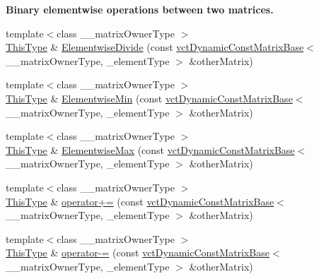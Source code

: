 \begin{Indent}{\bf Binary elementwise operations between two matrices.}
\begin{DoxyCompactItemize}
\item 
{\footnotesize template$<$class \-\_\-\-\_\-matrix\-Owner\-Type $>$ }\\\hyperlink{classvct_dynamic_const_matrix_base_ac4ff48cbe4d9de3fdef5a02447ffb9db}{This\-Type} \& \hyperlink{classvct_dynamic_matrix_base_a7be0d639e30525bfd8c4abfc39023b13}{Elementwise\-Divide} (const \hyperlink{classvct_dynamic_const_matrix_base}{vct\-Dynamic\-Const\-Matrix\-Base}$<$ \-\_\-\-\_\-matrix\-Owner\-Type, \-\_\-element\-Type $>$ \&other\-Matrix)
\item 
{\footnotesize template$<$class \-\_\-\-\_\-matrix\-Owner\-Type $>$ }\\\hyperlink{classvct_dynamic_const_matrix_base_ac4ff48cbe4d9de3fdef5a02447ffb9db}{This\-Type} \& \hyperlink{classvct_dynamic_matrix_base_aef9364af58997f201a1a3d56011e411c}{Elementwise\-Min} (const \hyperlink{classvct_dynamic_const_matrix_base}{vct\-Dynamic\-Const\-Matrix\-Base}$<$ \-\_\-\-\_\-matrix\-Owner\-Type, \-\_\-element\-Type $>$ \&other\-Matrix)
\item 
{\footnotesize template$<$class \-\_\-\-\_\-matrix\-Owner\-Type $>$ }\\\hyperlink{classvct_dynamic_const_matrix_base_ac4ff48cbe4d9de3fdef5a02447ffb9db}{This\-Type} \& \hyperlink{classvct_dynamic_matrix_base_a2c6d415e1bb9c356b9a843892b62b5c4}{Elementwise\-Max} (const \hyperlink{classvct_dynamic_const_matrix_base}{vct\-Dynamic\-Const\-Matrix\-Base}$<$ \-\_\-\-\_\-matrix\-Owner\-Type, \-\_\-element\-Type $>$ \&other\-Matrix)
\item 
{\footnotesize template$<$class \-\_\-\-\_\-matrix\-Owner\-Type $>$ }\\\hyperlink{classvct_dynamic_const_matrix_base_ac4ff48cbe4d9de3fdef5a02447ffb9db}{This\-Type} \& \hyperlink{classvct_dynamic_matrix_base_a733dcadf3529b4115cda4608cc2b9384}{operator+=} (const \hyperlink{classvct_dynamic_const_matrix_base}{vct\-Dynamic\-Const\-Matrix\-Base}$<$ \-\_\-\-\_\-matrix\-Owner\-Type, \-\_\-element\-Type $>$ \&other\-Matrix)
\item 
{\footnotesize template$<$class \-\_\-\-\_\-matrix\-Owner\-Type $>$ }\\\hyperlink{classvct_dynamic_const_matrix_base_ac4ff48cbe4d9de3fdef5a02447ffb9db}{This\-Type} \& \hyperlink{classvct_dynamic_matrix_base_a9612525d45c1ec8e22b2536ca80b1ac1}{operator-\/=} (const \hyperlink{classvct_dynamic_const_matrix_base}{vct\-Dynamic\-Const\-Matrix\-Base}$<$ \-\_\-\-\_\-matrix\-Owner\-Type, \-\_\-element\-Type $>$ \&other\-Matrix)
\end{DoxyCompactItemize}
\end{Indent}
